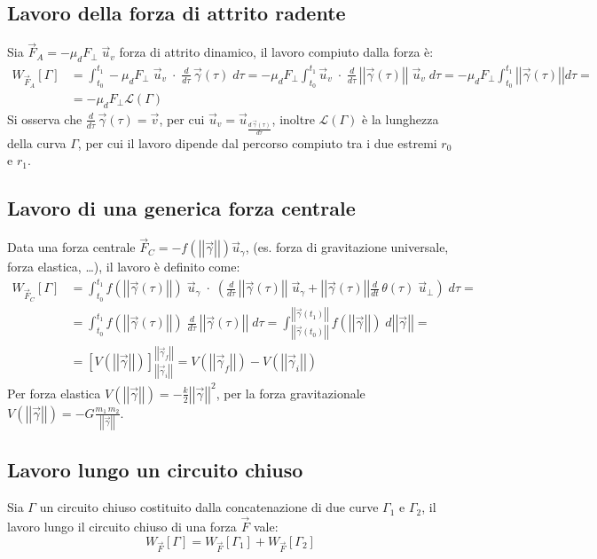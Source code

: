 \documentclass[a4paper]{article}
\newcommand\uv{\vec{u}_v}
\newcommand\ug{\vec{u}_\gamma}
\newcommand\uper{\vec{u}_\perp}
\newcommand\dt{\frac{d}{dt}\,}
\newcommand\dtau{\frac{d}{d\tau}\,}
\newcommand\vmod[1]{\left|\left|{#1}\right|\right|}
\begin{document}
\subsection{Lavoro della forza di attrito radente}
Sia \(\vec{F}_A = -\mu_d F_\perp \; \uv\) forza di attrito dinamico, il lavoro compiuto dalla forza è:
\begin{align*}
	W_{\vec{F}_A}[\Gamma] &= \int_{t_0}^{t_1} -\mu_d F_\perp \; \uv \; \cdot \; \dtau \vec{\gamma}(\tau) \; d\tau = -\mu_d F_\perp \int_{t_0}^{t_1} \uv \; \cdot \; \dtau \vmod{\vec{\gamma}(\tau)} \; \uv \; d\tau = -\mu_d F_\perp \int_{t_0}^{t_1} \vmod{\vec{\gamma}(\tau)} d\tau = \\
	&= -\mu_d F_\perp \mathcal{L}(\Gamma)
\end{align*}
Si osserva che \(\displaystyle \dtau \vec{\gamma}(\tau) = \vec{v}\), per cui \(\uv = \vec{u}_\frac{d \, \vec{\gamma}(\tau)}{d\tau}\),
inoltre \(\mathcal{L}(\Gamma)\) è la lunghezza della curva \(\Gamma\), per cui il lavoro dipende dal percorso compiuto tra i due
estremi \(r_0\) e \(r_1\).

\subsection{Lavoro di una generica forza centrale}
Data una forza centrale \(\vec{F}_C = - f(\vmod{\vec{\gamma}}) \ug\), (es. forza di gravitazione universale, forza elastica, \dots),
il lavoro è definito come:
\begin{align*}
	W_{\vec{F}_C}[\Gamma] &= \int_{t_0}^{t_1} f(\vmod{\vec{\gamma}(\tau)}) \; \ug \; \cdot \; \left( \dtau \vmod{\vec{\gamma}(\tau)} \; \ug + \vmod{\vec{\gamma}(\tau)} \dt \theta(\tau) \; \uper \right) \; d\tau = \\
	&= \int_{t_0}^{t_1} f(\vmod{\vec{\gamma}(\tau)}) \; \dtau \vmod{\vec{\gamma}(\tau)} \; d\tau = \int_{\vmod{\vec{\gamma}(t_0)}}^{\vmod{\vec{\gamma}(t_1)}} f(\vmod{\vec{\gamma}}) \; d\vmod{\vec{\gamma}} = \\
	&= \left[ V(\vmod{\vec{\gamma}}) \right]_{\vmod{\vec{\gamma}_i}}^{\vmod{\vec{\gamma}_f}} = V(\vmod{\vec{\gamma}_f}) - V(\vmod{\vec{\gamma}_i})
\end{align*}
Per forza elastica \(\displaystyle V(\vmod{\vec{\gamma}}) = -\frac{k}{2} \vmod{\vec{\gamma}}^2\), per la forza gravitazionale
\(\displaystyle V(\vmod{\vec{\gamma}}) = -G\frac{m_1 \, m_2}{\vmod{\vec{\gamma}}}\).

\subsection{Lavoro lungo un circuito chiuso}
Sia \(\Gamma\) un circuito chiuso costituito dalla concatenazione di due curve \(\Gamma_1\) e \(\Gamma_2\), il lavoro lungo il
circuito chiuso di una forza \(\vec{F}\) vale:
\[W_{\vec{F}}[\Gamma] = W_{\vec{F}}[\Gamma_1] + W_{\vec{F}}[\Gamma_2]\]
\end{document}
